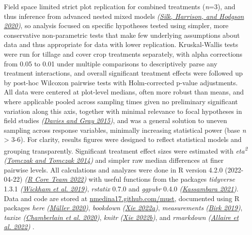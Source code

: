 \documentclass[
]{article}
\begin{document}
Field space limited strict plot replication for combined treatments (\emph{n}=3), and thus inference from advanced nested mixed models \emph{(\protect\hyperlink{ref-silk20}{Silk, Harrison, and Hodgson 2020})}, so analysis focused on specific hypotheses tested using simpler, more conservative non-parametric tests that make few underlying assumptions about data and thus appropriate for data with lower replication.
Kruskal-Wallis tests were run for tillage and cover crop treatments separately, with alpha corrections from 0.05 to 0.01 under multiple comparisons to descriptively parse any treatment interactions, and overall significant treatment effects were followed up by post-hoc Wilcoxon pairwise tests with Holm-corrected p-value adjustments.
All data were centered at plot-level medians, often more robust than means, and where applicable pooled across sampling times given no preliminary significant variation along this axis, together with minimal relevance to focal hypotheses in field studies \emph{(\protect\hyperlink{ref-davies15b}{Davies and Gray 2015})}, and was a general solution to uneven sampling across response variables, minimally increasing statistical power (base \emph{n} \textgreater{} 3-6).
For clarity, results figures were designed to reflect statistical models and grouping transparently.
Significant treatment effect sizes were estimated with \emph{eta\textsuperscript{2}} \emph{(\protect\hyperlink{ref-tomczak14}{Tomczak and Tomczak 2014})} and simpler raw median differences at finer pairwise levels.
All calculations and analyzes were done in R version 4.2.0 (2022-04-22) \emph{(\protect\hyperlink{ref-base}{R Core Team 2022})} with useful functions from the packages \emph{tidyverse} 1.3.1 \emph{(\protect\hyperlink{ref-tidyverse}{Wickham et al. 2019})}, \emph{rstatix} 0.7.0 and \emph{ggpubr} 0.4.0 \emph{(\protect\hyperlink{ref-rstatix}{Kassambara 2021})}.
Data and code are stored at \url{nmedina17.github.com/must},
documented using R packages \emph{here} \emph{(\protect\hyperlink{ref-here}{Müller 2020})}, \emph{bookdown} \emph{(\protect\hyperlink{ref-bookdown2022}{Xie 2022a})}, \emph{measurements} \emph{(\protect\hyperlink{ref-measurements}{Birk 2019})}, \emph{taxize} \emph{(\protect\hyperlink{ref-taxize2020}{Chamberlain et al. 2020})}, \emph{knitr} \emph{(\protect\hyperlink{ref-knitr2022}{Xie 2022b})}, and \emph{rmarkdown} \emph{(\protect\hyperlink{ref-rmarkdown2022}{Allaire et al. 2022})}
.
\end{document}
